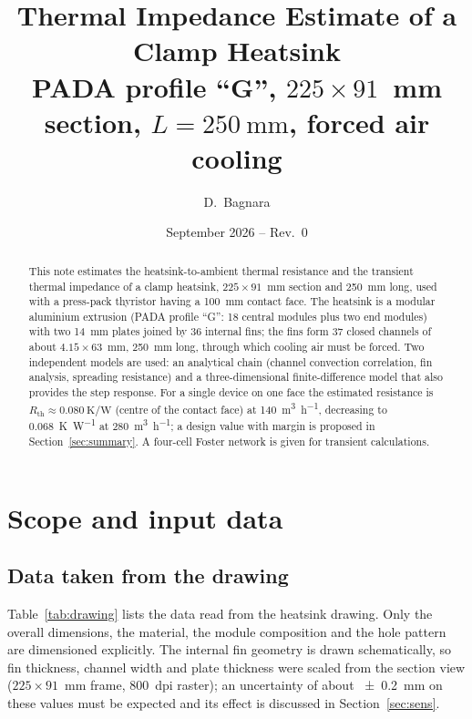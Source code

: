 \documentclass[11pt,a4paper]{article}
\title{Thermal Impedance Estimate of a Clamp Heatsink\\
\large PADA profile ``G'', $225\times91$~mm section, $L=\SI{250}{\milli\metre}$, forced air cooling}
\author{D.~Bagnara}
\date{September 2026 -- Rev.~0}
\newcommand{\Rth}{R_{\mathrm{th}}}
\begin{document}
\maketitle

\begin{abstract}
This note estimates the heatsink-to-ambient thermal resistance and the transient thermal impedance of a clamp heatsink, $225\times91$~mm section and \SI{250}{\milli\metre} long, used with a press-pack thyristor having a \SI{100}{\milli\metre} contact face. The heatsink is a modular aluminium extrusion (PADA profile ``G'': 18 central modules plus two end modules) with two \SI{14}{\milli\metre} plates joined by 36 internal fins; the fins form 37 closed channels of about $4.15\times63$~mm, \SI{250}{\milli\metre} long, through which cooling air must be forced. Two independent models are used: an analytical chain (channel convection correlation, fin analysis, spreading resistance) and a three-dimensional finite-difference model that also provides the step response. For a single device on one face the estimated resistance is $\Rth\approx\SI{0.080}{\kelvin\per\watt}$ (centre of the contact face) at \SI{140}{\cubic\metre\per\hour}, decreasing to \SI{0.068}{\kelvin\per\watt} at \SI{280}{\cubic\metre\per\hour}; a design value with margin is proposed in Section~\ref{sec:summary}. A four-cell Foster network is given for transient calculations.
\end{abstract}

\section{Scope and input data}\label{sec:input}

\subsection{Data taken from the drawing}

Table~\ref{tab:drawing} lists the data read from the heatsink drawing. Only the overall dimensions, the material, the module composition and the hole pattern are dimensioned explicitly. The internal fin geometry is drawn schematically, so fin thickness, channel width and plate thickness were scaled from the section view ($225\times91$~mm frame, 800~dpi raster); an uncertainty of about \SI{\pm 0.2}{\milli\metre} on these values must be expected and its effect is discussed in Section~\ref{sec:sens}.
\end{document}
